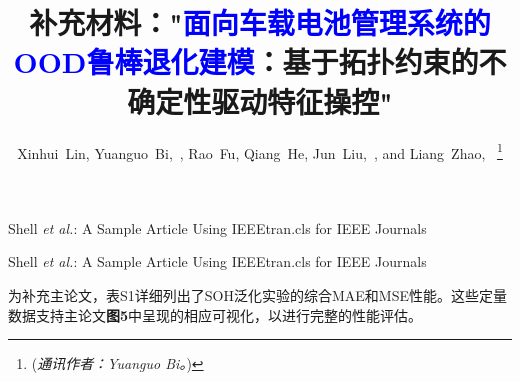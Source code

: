 \documentclass[lettersize,onecolumn]{IEEEtran}
\newcommand{\rev}[1]{\textcolor{blue}{#1}}
\begin{document}
\title{补充材料："\rev{面向车载电池管理系统的OOD鲁棒退化建模}：基于拓扑约束的不确定性驱动特征操控"}

\markboth{}%
{Shell \MakeLowercase{\textit{et al.}}: A Sample Article Using IEEEtran.cls for IEEE Journals}

\author{
    Xinhui~Lin,
    Yuanguo~Bi,~,
    Rao~Fu,
    Qiang~He,
    Jun~Liu,~,
    and Liang~Zhao,~
    \vspace{-1.5em}
\thanks{(\emph{通讯作者：Yuanguo Bi。})}
}

%
{Shell \MakeLowercase{\textit{et al.}}: A Sample Article Using IEEEtran.cls for IEEE Journals}

\maketitle

为补充主论文，表S1详细列出了SOH泛化实验的综合MAE和MSE性能。这些定量数据支持主论文\textbf{图5}中呈现的相应可视化，以进行完整的性能评估。
\end{document}
